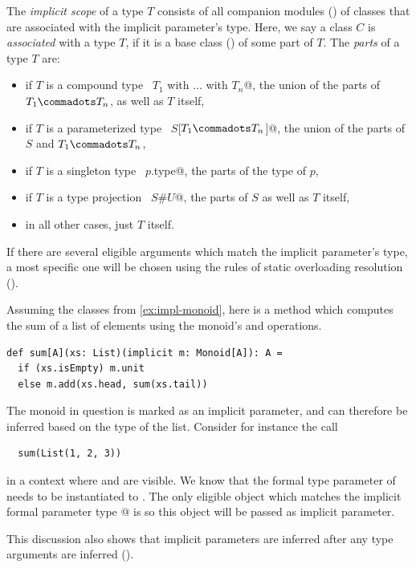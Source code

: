 The {\em implicit scope} of a type $T$ consists of all companion modules
() of classes that are associated with the
implicit parameter's type.  Here, we say a class $C$ is {\em
associated} with a type $T$, if it is a base class
() of some part of $T$.  The {\em parts} of a
type $T$ are:
\begin{itemize}
\item
if $T$ is a compound type ~\lstinline@$T_1$ with $\ldots$ with $T_n$@, the
union of the parts of $T_1 \commadots T_n$, as well as $T$ itself,
\item
if $T$ is a parameterized type ~\lstinline@$S$[$T_1 \commadots T_n$]@, 
the union of the parts of $S$ and $T_1 \commadots T_n$,
\item
if $T$ is a singleton type ~\lstinline@$p$.type@, the parts of the type
of $p$,
\item
if $T$ is a type projection ~\lstinline@$S$#$U$@, the parts of $S$ as
well as $T$ itself,
\item
in all other cases, just $T$ itself.
\end{itemize}

If there are several eligible arguments which match the implicit
parameter's type, a most specific one will be chosen using the rules
of static overloading resolution ().

\example Assuming the classes from \ref{ex:impl-monoid}, here is a 
method which computes the sum of a list of elements using the
monoid's  and  operations.
\begin{lstlisting}
def sum[A](xs: List)(implicit m: Monoid[A]): A = 
  if (xs.isEmpty) m.unit
  else m.add(xs.head, sum(xs.tail))
\end{lstlisting}
The monoid in question is marked as an implicit parameter, and can therefore
be inferred based on the type of the list.
Consider for instance the call 
\begin{lstlisting}
  sum(List(1, 2, 3))
\end{lstlisting}
in a context where \lstinline@stringMonoid@ and \lstinline@intMonoid@
are visible.  We know that the formal type parameter \lstinline@a@ of
\lstinline@sum@ needs to be instantiated to \lstinline@Int@. The only
eligible object which matches the implicit formal parameter type
\lstinline@Monoid[Int]@ is \lstinline@intMonoid@ so this object will
be passed as implicit parameter.\bigskip

This discussion also shows that implicit parameters are inferred after
any type arguments are inferred (). 

